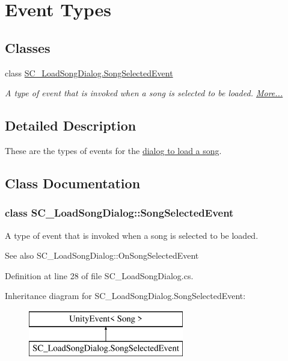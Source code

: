 \hypertarget{group___s_c___l_s_d_event_types}{}\section{Event Types}
\label{group___s_c___l_s_d_event_types}
\subsection*{Classes}
\begin{DoxyCompactItemize}
\item 
class \hyperlink{group___s_c___l_s_d_event_types_class_s_c___load_song_dialog_1_1_song_selected_event}{S\+C\+\_\+\+Load\+Song\+Dialog.\+Song\+Selected\+Event}
\begin{DoxyCompactList}\small\item\em A type of event that is invoked when a song is selected to be loaded.  \hyperlink{group___s_c___l_s_d_event_types_class_s_c___load_song_dialog_1_1_song_selected_event}{More...}\end{DoxyCompactList}\end{DoxyCompactItemize}


\subsection{Detailed Description}
These are the types of events for the \hyperlink{group___doc_s_c___l_s_d}{dialog to load a song}. 

\subsection{Class Documentation}
\label{class_s_c___load_song_dialog_1_1_song_selected_event}
\subsubsection{class S\+C\+\_\+\+Load\+Song\+Dialog\+:\+:Song\+Selected\+Event}
A type of event that is invoked when a song is selected to be loaded. 

\begin{DoxySeeAlso}{See also}
S\+C\+\_\+\+Load\+Song\+Dialog\+::\+On\+Song\+Selected\+Event 
\end{DoxySeeAlso}


Definition at line 28 of file S\+C\+\_\+\+Load\+Song\+Dialog.\+cs.

Inheritance diagram for S\+C\+\_\+\+Load\+Song\+Dialog.\+Song\+Selected\+Event\+:\begin{figure}[H]
\begin{center}
\leavevmode
\includegraphics[height=2.000000cm]{group___s_c___l_s_d_event_types}
\end{center}
\end{figure}
